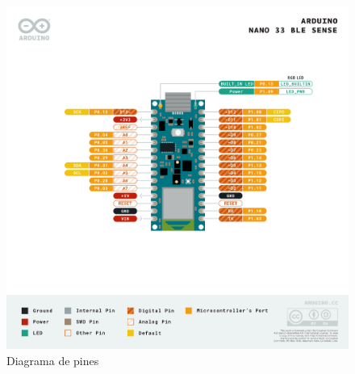 \begin{figure}[H]
\centering
\includegraphics[scale=0.7]{./images/io.png} 
\caption{Diagrama de pines \cite{placa}}
\label{f2}
\end{figure}

